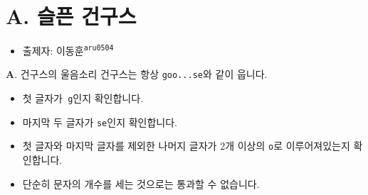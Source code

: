 \section{A. 슬픈 건구스}

\begin{frame} %
    \begin{itemize}
        \item 출제자: 이동훈\textsuperscript{\color{kupc-gray}\texttt{aru0504}}
    \end{itemize}
\end{frame}

\begin{frame}{\textbf{A}. 건구스의 울음소리}
   건구스는 항상 \texttt{goo...se}와 같이 웁니다.

    \vspace{18pt}

    \begin{itemize}
        \item 첫 글자가\texttt{ \color{kupc-green}g}인지 확인합니다.
        \item 마지막 두 글자가  \texttt{\color{kupc-green}se}인지 확인합니다.
        \item 첫 글자와 마지막 글자를 제외한 나머지 글자가 2개 이상의 \texttt{\color{kupc-green}o}로 이루어져있는지 확인합니다.
	\item 단순히 문자의 개수를 세는 것으로는 통과할 수 없습니다.
    \end{itemize}

\end{frame}